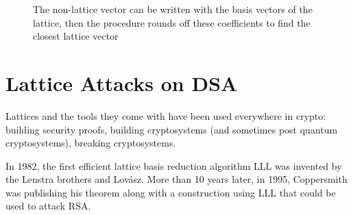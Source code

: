 \documentclass[a4paper,11pt]{article}
\begin{document}
\begin{figure}[H]
  \caption{The non-lattice vector can be written with the basis vectors of the lattice, then the procedure rounds off these coefficients to find the closest lattice vector}
\end{figure}

\section{Lattice Attacks on DSA}

Lattices and the tools they come with have been used everywhere in crypto: building security proofs, building cryptosystems (and sometimes post quantum cryptosystems), breaking cryptosystems.

In 1982, the first efficient lattice basis reduction algorithm LLL was invented by the Lenstra brothers and Lovász\cite{lll}. More than 10 years later, in 1995, Coppersmith was publishing his theorem along with a construction using LLL that could be used to attack RSA\cite{coppersmith}.
\end{document}
